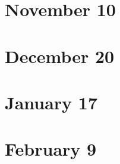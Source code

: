\documentclass{../../../small}
\begin{document}
\newpage
\section{November 10}



\newpage
\section{December 20}



\newpage
\section{January 17}



\newpage
\section{February 9}
\end{document}
